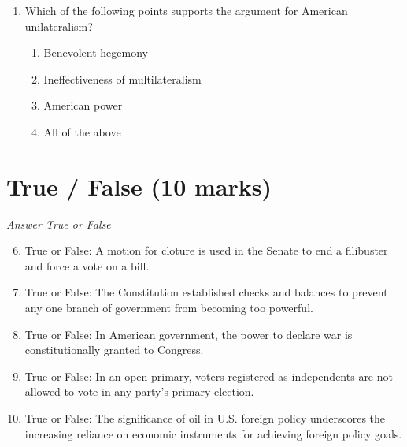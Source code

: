 \documentclass[12pt]{article}
\begin{document}
\begin{enumerate}[label=\arabic*.]
\begin{enumerate}[label=(\alph*)]
    \item The death penalty may only be imposed upon citizens.
    \item Under some circumstances, the death penalty may not violate the Eighth Amendment.
    \item Under some circumstances, the death penalty may violate the Third Amendment.
    \item States may execute any adult regardless of intellectual disability.
\end{enumerate}
\item Which of the following points supports the argument for American unilateralism?
\begin{enumerate}[label=(\alph*)]
    \item Benevolent hegemony
    \item Ineffectiveness of multilateralism
    \item American power
    \item All of the above
\end{enumerate}
\end{enumerate}

\section*{True / False (10 marks)}
\textit{Answer True or False}
\begin{enumerate}[label=\arabic*.]
\setcounter{enumi}{5}
\item True or False: A motion for cloture is used in the Senate to end a filibuster and force a vote on a bill.
\item True or False: The Constitution established checks and balances to prevent any one branch of government from becoming too powerful.
\item True or False: In American government, the power to declare war is constitutionally granted to Congress.
\item True or False: In an open primary, voters registered as independents are not allowed to vote in any party's primary election.
\item True or False: The significance of oil in U.S. foreign policy underscores the increasing reliance on economic instruments for achieving foreign policy goals.
\end{enumerate}
\end{document}
